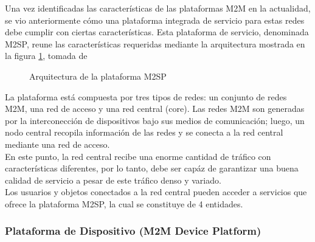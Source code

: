 \documentclass[journal]{IEEEtran}
\begin{document}
Una vez identificadas las características de las plataformas M2M en la actualidad, se vio anteriormente cómo una plataforma integrada de servicio para estas redes debe cumplir con ciertas características. Esta plataforma de servicio, denominada M2SP, reune las características requeridas mediante la arquitectura mostrada en la figura \ref{arqM2SP}, tomada de \cite{paper1} 

\begin{figure}[h]
\centering
{}
\caption{Arquitectura de la plataforma M2SP}
\label{arqM2SP}
\end{figure}

La plataforma está compuesta por tres tipos de redes: un conjunto de redes M2M, una red de acceso y una red central (core). Las redes M2M son generadas por la interconección de dispositivos bajo sus medios de comunicación; luego, un nodo central recopila información de las redes y se conecta a la red central mediante una red de acceso.\\

En este punto, la red central recibe una enorme cantidad de tráfico con características diferentes, por lo tanto, debe ser capáz de garantizar una buena calidad de servicio a pesar de este tráfico denso y variado.\\

Los usuarios y objetos conectados a la red central pueden acceder a servicios que ofrece la plataforma M2SP, la cual se constituye de 4 entidades.\\

\subsubsection{Plataforma de Dispositivo (M2M Device Platform)}
\end{document}
